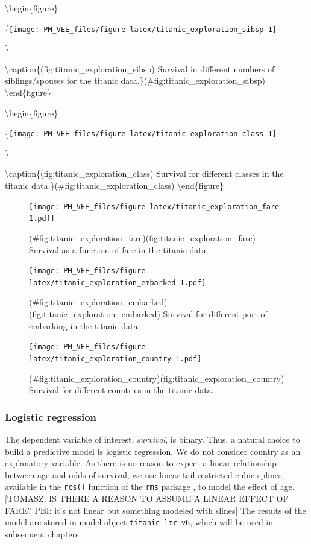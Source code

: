\documentclass[12pt,]{krantz}
\theoremstyle{definition}
\theoremstyle{definition}
\theoremstyle{definition}
\theoremstyle{remark}
\begin{document}
\textbackslash{}begin\{figure\}

\{\centering \texttt{[image: PM\_VEE\_files/figure-latex/titanic\_exploration\_sibsp-1]}

\}

\textbackslash{}caption\{(fig:titanic\_exploration\_sibsp) Survival in
different numbers of siblings/spouses for the titanic
data.\}(\#fig:titanic\_exploration\_sibsp) \textbackslash{}end\{figure\}

\textbackslash{}begin\{figure\}

\{\centering \texttt{[image: PM\_VEE\_files/figure-latex/titanic\_exploration\_class-1]}

\}

\textbackslash{}caption\{(fig:titanic\_exploration\_class) Survival for
different classes in the titanic
data.\}(\#fig:titanic\_exploration\_class) \textbackslash{}end\{figure\}

\begin{figure}
\centering
\texttt{[image: PM\_VEE\_files/figure-latex/titanic\_exploration\_fare-1.pdf]}
\caption{(\#fig:titanic\_exploration\_fare)(fig:titanic\_exploration\_fare)
Survival as a function of fare in the titanic data.}
\end{figure}

\begin{figure}
\centering
\texttt{[image: PM\_VEE\_files/figure-latex/titanic\_exploration\_embarked-1.pdf]}
\caption{(\#fig:titanic\_exploration\_embarked)(fig:titanic\_exploration\_embarked)
Survival for different port of embarking in the titanic data.}
\end{figure}

\begin{figure}
\centering
\texttt{[image: PM\_VEE\_files/figure-latex/titanic\_exploration\_country-1.pdf]}
\caption{(\#fig:titanic\_exploration\_country)(fig:titanic\_exploration\_country)
Survival for different countries in the titanic data.}
\end{figure}

\hypertarget{model_titanic_lmr}{%
\subsubsection{Logistic regression}\label{model_titanic_lmr}}

The dependent variable of interest, \emph{survival}, is binary. Thus, a
natural choice to build a predictive model is logistic regression. We do
not consider country as an explanatory variable. As there is no reason
to expect a linear relationship between age and odds of survival, we use
linear tail-restricted cubic splines, available in the \texttt{rcs()}
function of the \texttt{rms} package \citep{rms}, to model the effect of
age. {[}TOMASZ: IS THERE A REASON TO ASSUME A LINEAR EFFECT OF FARE?
PBI: it's not linear but something modeled with slines{]} The results of
the model are stored in model-object \texttt{titanic\_lmr\_v6}, which
will be used in subsequent chapters.
\end{document}
